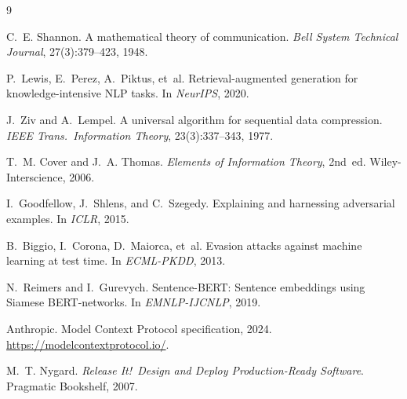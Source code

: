 \documentclass[11pt,twocolumn]{article}
\begin{document}
\balance
\begin{thebibliography}{9}

C.~E. Shannon.
\newblock A mathematical theory of communication.
\newblock \emph{Bell System Technical Journal}, 27(3):379--423, 1948.

P.~Lewis, E.~Perez, A.~Piktus, et~al.
\newblock Retrieval-augmented generation for knowledge-intensive {NLP} tasks.
\newblock In \emph{NeurIPS}, 2020.

J.~Ziv and A.~Lempel.
\newblock A universal algorithm for sequential data compression.
\newblock \emph{IEEE Trans.\ Information Theory}, 23(3):337--343, 1977.

T.~M. Cover and J.~A. Thomas.
\newblock \emph{Elements of Information Theory}, 2nd~ed.
\newblock Wiley-Interscience, 2006.

I.~Goodfellow, J.~Shlens, and C.~Szegedy.
\newblock Explaining and harnessing adversarial examples.
\newblock In \emph{ICLR}, 2015.

B.~Biggio, I.~Corona, D.~Maiorca, et~al.
\newblock Evasion attacks against machine learning at test time.
\newblock In \emph{ECML-PKDD}, 2013.

N.~Reimers and I.~Gurevych.
\newblock Sentence-{BERT}: Sentence embeddings using {S}iamese {BERT}-networks.
\newblock In \emph{EMNLP-IJCNLP}, 2019.

Anthropic.
\newblock Model Context Protocol specification, 2024.
\newblock \url{https://modelcontextprotocol.io/}.

M.~T. Nygard.
\newblock \emph{Release It!\ Design and Deploy Production-Ready Software}.
\newblock Pragmatic Bookshelf, 2007.

\end{thebibliography}
\end{document}
